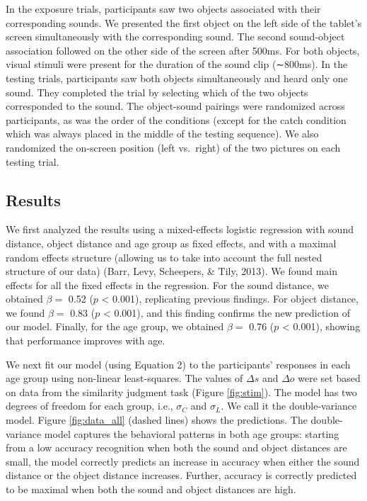 \documentclass[10pt, letterpaper]{article}
\begin{document}
In the exposure trials, participants saw two objects associated with
their corresponding sounds. We presented the first object on the left
side of the tablet's screen simultaneously with the corresponding sound.
The second sound-object association followed on the other side of the
screen after 500ms. For both objects, visual stimuli were present for
the duration of the sound clip (∼800ms). In the testing trials,
participants saw both objects simultaneously and heard only one sound.
They completed the trial by selecting which of the two objects
corresponded to the sound. The object-sound pairings were randomized
across participants, as was the order of the conditions (except for the
catch condition which was always placed in the middle of the testing
sequence). We also randomized the on-screen position (left vs.~right) of
the two pictures on each testing trial.

\subsection{Results}\label{results}

We first analyzed the results using a mixed-effects logistic regression
with sound distance, object distance and age group as fixed effects, and
with a maximal random effects structure (allowing us to take into
account the full nested structure of our data) (Barr, Levy, Scheepers,
\& Tily, 2013). We found main effects for all the fixed effects in the
regression. For the sound distance, we obtained \(\beta =\) 0.52 (\(p\)
\textless{} 0.001), replicating previous findings. For object distance,
we found \(\beta =\) 0.83 (\(p\) \textless{} 0.001), and this finding
confirms the new prediction of our model. Finally, for the age group, we
obtained \(\beta =\) 0.76 (\(p\) \textless{} 0.001), showing that
performance improves with age.

We next fit our model (using Equation 2) to the participants' responses
in each age group using non-linear least-squares. The values of
\(\Delta s\) and \(\Delta o\) were set based on data from the similarity
judgment task (Figure \ref{fig:stim}). The model has two degrees of
freedom for each group, i.e., \(\sigma_C\) and \(\sigma_L\). We call it
the double-variance model. Figure \ref{fig:data_all} (dashed lines)
shows the predictions. The double-variance model captures the behavioral
patterns in both age groups: starting from a low accuracy recognition
when both the sound and object distances are small, the model correctly
predicts an increase in accuracy when either the sound distance or the
object distance increases. Further, accuracy is correctly predicted to
be maximal when both the sound and object distances are high.
\end{document}
